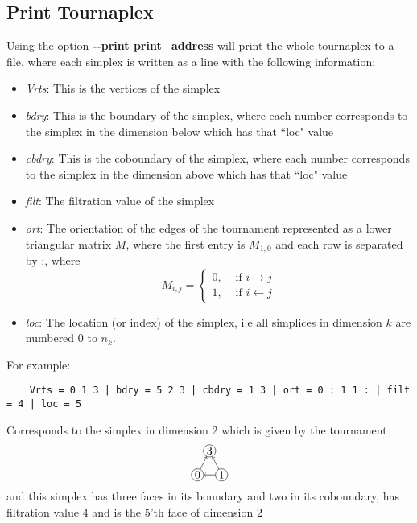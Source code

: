 \documentclass{amsart}
\theoremstyle{definition}
\begin{document}
\subsection{Print Tournaplex}
Using the option \textbf{-{}-print print\_address} will print the whole tournaplex to a file, where each simplex is written as a line with the following information:
  \begin{itemize}
    \item \emph{Vrts}: This is the vertices of the simplex
    \item \emph{bdry}: This is the boundary of the simplex, where each number corresponds to the simplex in the dimension below which has that ``loc" value
    \item \emph{cbdry}: This is the coboundary of the simplex, where each number corresponds to the simplex in the dimension above which has that ``loc" value
    \item \emph{filt}: The filtration value of the simplex
    \item \emph{ort}: The orientation of the edges of the tournament represented as a lower triangular matrix $M$, where the first entry is $M_{1,0}$ and each row is separated by :,
     where $$M_{i,j}=\begin{cases}0,&\mbox{ if }i\rightarrow j\\1,&\mbox{ if }i\leftarrow j\end{cases}$$
    \item \emph{loc}: The location (or index) of the simplex, i.e all simplices in dimension $k$ are numbered $0$ to $n_k$.
  \end{itemize}
  For example:
  \begin{verbatim}
    Vrts = 0 1 3 | bdry = 5 2 3 | cbdry = 1 3 | ort = 0 : 1 1 : | filt = 4 | loc = 5
  \end{verbatim}
  Corresponds to the simplex in dimension 2 which is given by the tournament $$\begin{tikzpicture}[scale=.75]
	\node[circle, draw=black,inner sep=1pt] (0) at (0,0){$0$};
	\node[circle, draw=black,inner sep=1pt] (1) at (1,0){$1$};
	\node[circle, draw=black,inner sep=1pt] (3) at (.5,1){$3$};
	\draw[->] (1) -- (0);
	\draw[->] (0) -- (3);
	\draw[->] (1) -- (3);
   \end{tikzpicture}$$
  and this simplex has three faces in its boundary and two in its coboundary, has filtration value $4$ and is the $5$'th face of dimension 2

\vfill
\end{document}
